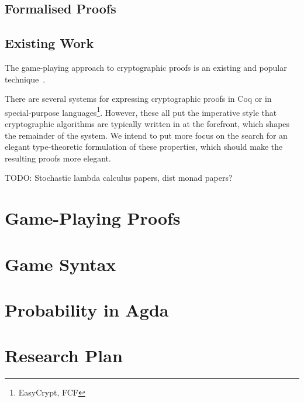 \documentclass{report}
\begin{document}
\section{Formalised Proofs}

\section{Existing Work}

The game-playing approach to cryptographic proofs is an existing and popular technique~\cite{codebasedgames}.

There are several systems for expressing cryptographic proofs in Coq or in special-purpose
languages\footnote{EasyCrypt, FCF}.  However, these all put the imperative style that cryptographic algorithms are
typically written in at the forefront, which shapes the remainder of the system.  We intend to put more focus on the
search for an elegant type-theoretic formulation of these properties, which should make the resulting proofs more
elegant.

TODO: Stochastic lambda calculus papers, dist monad papers?
    \chapter{Game-Playing Proofs}

    \chapter{Game Syntax}



    \chapter{Probability in Agda}

    \chapter{Research Plan}

\end{document}
